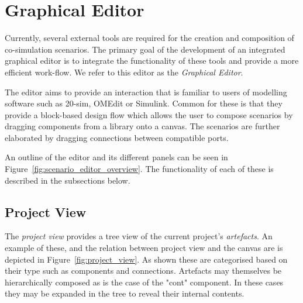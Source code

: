 \section{Graphical Editor}\label{sec:intocps}

Currently, several external tools are required for the creation and composition of co-simulation scenarios.
The primary goal of the development of an integrated graphical editor is to integrate the functionality of these tools and provide a more efficient work-flow.
We refer to this editor as the \emph{Graphical Editor}.

The editor aims to provide an interaction that is familiar to users of modelling software such as 20-sim, OMEdit or Simulink.
Common for these is that they provide a block-based design flow which allows the user to compose scenarios by dragging components from a library onto a canvas.
The scenarios are further elaborated by dragging connections between compatible ports. 

An outline of the editor and its different panels can be seen in Figure~\ref{fig:scenario_editor_overview}.
The functionality of each of these is described in the subsections below.





\subsection{Project View}
The \emph{project view} provides a tree view of the current project's \emph{artefacts}.
An example of these, and the relation between project view and the canvas are is depicted in Figure~\ref{fig:project_view}.
As shown these are categorised based on their type such as components and connections.
Artefacts may themselves be hierarchically composed as is the case of the "cont" component.
In these cases they may be expanded in the tree to reveal their internal contents.





